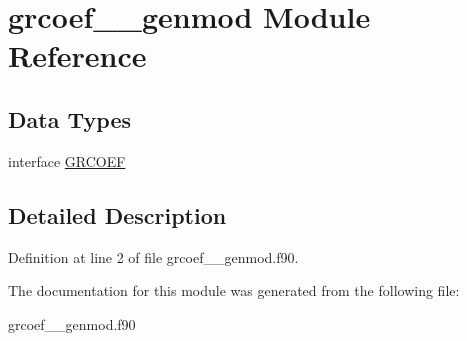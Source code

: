 \hypertarget{classgrcoef____genmod}{\section{grcoef\+\_\+\+\_\+genmod Module Reference}
\label{classgrcoef____genmod}
}
\subsection*{Data Types}
\begin{DoxyCompactItemize}
\item 
interface \hyperlink{interfacegrcoef____genmod_1_1_g_r_c_o_e_f}{G\+R\+C\+O\+E\+F}
\end{DoxyCompactItemize}


\subsection{Detailed Description}


Definition at line 2 of file grcoef\+\_\+\+\_\+genmod.\+f90.



The documentation for this module was generated from the following file\+:\begin{DoxyCompactItemize}
\item 
grcoef\+\_\+\+\_\+genmod.\+f90\end{DoxyCompactItemize}
